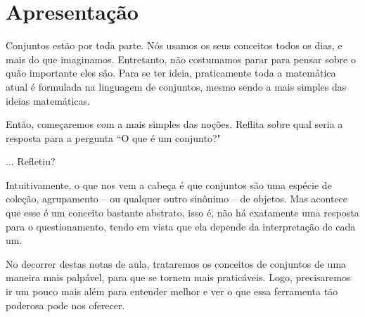 \section{Apresentação}

Conjuntos estão por toda parte. Nós usamos os seus conceitos todos os dias, e mais do que imaginamos. Entretanto, não costumamos parar para pensar sobre o quão importante eles são.
Para se ter ideia, praticamente toda a matemática atual é formulada na linguagem de conjuntos, mesmo sendo a mais simples das ideias matemáticas.

Então, começaremos com a mais simples das noções. Reflita sobre qual seria a resposta para a pergunta ``O que é um conjunto?"

... Refletiu?

Intuitivamente, o que nos vem a cabeça é que conjuntos são uma espécie de coleção, agrupamento -- ou qualquer outro sinônimo -- de objetos.
Mas acontece que esse é um conceito bastante abstrato, isso é, não há exatamente uma resposta para o questionamento, tendo em vista que ela depende da interpretação de cada um.

No decorrer destas notas de aula, trataremos os conceitos de conjuntos de uma maneira mais palpável, para que se tornem mais praticáveis.
Logo, precisaremos ir um pouco mais além para entender melhor e ver o que essa ferramenta tão poderosa pode nos oferecer.

